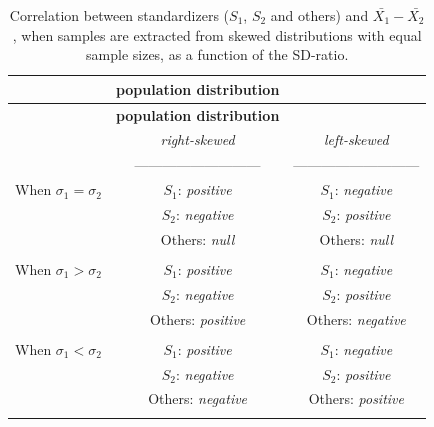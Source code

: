 \documentclass[
  english,
  man,mask]{apa6}
\begin{document}
\begin{longtable}[]{@{}lcc@{}}
\caption{Correlation between standardizers (\(S_1\), \(S_2\) and others) and \(\bar{X_1}-\bar{X_2}\), when samples are extracted from skewed distributions with equal sample sizes, as a function of the SD-ratio.}\tabularnewline
\toprule
& \textbf{\textbf{population distribution}} & \\
\midrule
\endfirsthead
\toprule
& \textbf{\textbf{population distribution}} & \\
\midrule
\endhead
& \emph{right-skewed} & \emph{left-skewed} \\
& --------------------------- & --------------------------- \\
When \(\sigma_1=\sigma_2\) & \(S_1\): \emph{positive} & \(S_1\): \emph{negative} \\
& \(S_2\): \emph{negative} & \(S_2\): \emph{positive} \\
& Others: \emph{null} & Others: \emph{null} \\
& & \\
When \(\sigma_1>\sigma_2\) & \(S_1\): \emph{positive} & \(S_1\): \emph{negative} \\
& \(S_2\): \emph{negative} & \(S_2\): \emph{positive} \\
& Others: \emph{positive} & Others: \emph{negative} \\
& & \\
When \(\sigma_1<\sigma_2\) & \(S_1\): \emph{positive} & \(S_1\): \emph{negative} \\
& \(S_2\): \emph{negative} & \(S_2\): \emph{positive} \\
& Others: \emph{negative} & Others: \emph{positive} \\
& & \\
\bottomrule
\end{longtable}
\end{document}
